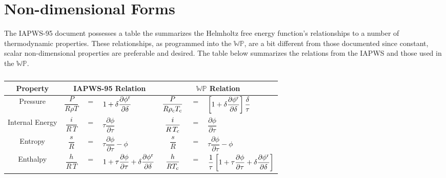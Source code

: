\documentclass[12pt]{article}
\newcommand{\WP} {\ensuremath{\mathbb{WP}}\xspace}
\newcommand{\HFE}{Helmholtz free energy\xspace}
\newcommand{\pdiff}[2]{\dfrac{\partial{#1}}{\partial{#2}}}
\newcommand{\rhoc} {\ensuremath{\rho_{\mbox{\scriptsize c}}}}
\newcommand{\Tc}   {\ensuremath{T_{\mbox{\scriptsize c}}}}
\newcommand{\phiR} {\ensuremath{\phi^{\mbox{\scriptsize r}}}}
\newcommand{\phiRd}{\ensuremath{    \pdiff{\phiR}{\delta}   }}
\newcommand{\phit}{\ensuremath{     \pdiff{\phi} {\tau  }   }}
\newcommand{\Skip}{\rule[-1.4em]{0pt}{3.3em} \\[0pt]}
\begin{document}
\section{Non-dimensional Forms}
The IAPWS-95 document possesses a table the summarizes the \HFE function's relationships to a number of thermodynamic properties.
These relationships, as programmed into the \WP, are a bit different from those documented since constant, scalar non-dimensional properties are preferable and desired.
The table below summarizes the relations from the IAPWS and those used in the \WP.
\begin{table}[h!]%
    \newcommand{\EqualSign}[1][-0.8em]{\hspace{#1}$=$}
    \newcommand{\Pull     }[1][-0.8em]{\hspace{#1}}
    \newcommand{\Push     }[1][ 0.5em]{\hspace{#1}}
    \begin{center}
        \caption{}
        \label{}
        \begin{tabular}{c c c l c c l}
            \toprule
            Property  & \multicolumn{3}{c}{IAPWS-95 Relation} & \multicolumn{3}{c}{\WP Relation} \\\midrule
            Pressure 
                &\Push$\dfrac{P}{R\rho{T}}  $&\Pull$=$&\Pull$ 1 + \delta \phiRd$ 
                &\Push$\dfrac{P}{R\rhoc\Tc} $&\Pull$=$&\Pull$  \left[1 + \delta \phiRd\right]\dfrac{\delta}{\tau}$ \Skip
            Internal Energy
                &\Push$\dfrac{i}{R\,T  }    $&\Pull$=$&\Pull$  \tau \phit$ 
                &\Push$\dfrac{i}{R\,\Tc}    $&\Pull$=$&\Pull$   \phit    $  \Skip
            Entropy
                &\Push$\dfrac{s}{R}         $&\Pull$=$&\Pull$  \tau\phit - \phi$ 
                &\Push$\dfrac{s}{R}         $&\Pull$=$&\Pull$  \tau\phit - \phi$ \Skip
            Enthalpy
                &\Push$\dfrac{h}{R\,T}      $&\Pull$=$&\Pull$   1 + \tau \phit + \delta \phiRd$ 
                &\Push$\dfrac{h}{R\Tc}      $&\Pull$=$&\Pull$ \dfrac{1}{\tau}\left[1 + \tau \phit + \delta \phiRd\right]    $ \Skip
            \bottomrule
        \end{tabular}
    \end{center}
\end{table}
\end{document}
